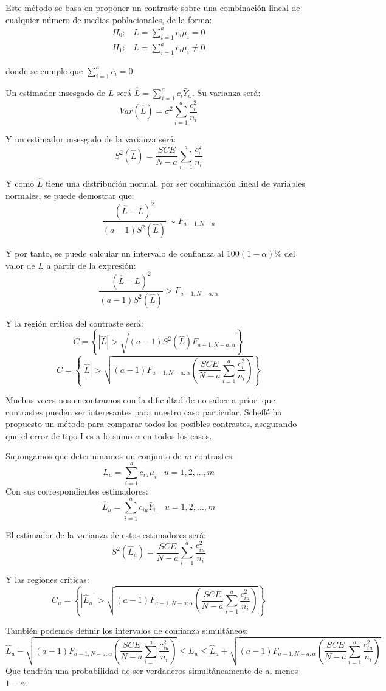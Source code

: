 
Este m\'etodo se basa en proponer un contraste sobre una combinaci\'on lineal de cualquier n\'umero de medias poblacionales, de la forma:
\begin{align}
H_0:&L=\sum_{i=1}^ac_i\mu_i=0\\
H_1:&L=\sum_{i=1}^ac_i\mu_i\neq0
\end{align}

donde se cumple que $\sum_{i=1}^ac_i=0$.

Un estimador insesgado de $L$ ser\'a $\hat{L}=\sum_{i=1}^ac_i\bar{Y}_{i.}$. Su varianza ser\'a:
\[Var(\hat{L})=\sigma^2\sum_{i=1}^a\dfrac{c_i^2}{n_i}\]

Y un estimador insesgado de la varianza ser\'a:
\[S^2(\hat{L})=\dfrac{SCE}{N-a}\sum_{i=1}^a\dfrac{c_i^2}{n_i}\]

Y como $\hat{L}$ tiene una distribuci\'on normal, por ser combinaci\'on lineal de variables normales, se puede demostrar que:
\[\dfrac{(\hat{L}-L)^2}{(a-1)S^2(\hat{L})}\sim F_{a-1;N-a}\]

Y por tanto, se puede calcular un intervalo de confianza al $100(1-\alpha)\%$ del valor de $L$ a partir de la expresi\'on:
\[\dfrac{(\hat{L}-L)^2}{(a-1)S^2(\hat{L})}> F_{a-1,N-a:\alpha}\]

Y la regi\'on cr\'itica del contraste ser\'a: 
\[C=\left\{|\hat{L}|>\sqrt{(a-1)S^2(\hat{L})F_{a-1,N-a:\alpha}}\right\}\]
\[C=\left\{|\hat{L}|>\sqrt{(a-1)F_{a-1,N-a:\alpha}\left(\dfrac{SCE}{N-a}\sum_{i=1}^a\dfrac{c_i^2}{n_i}\right)}\right\}\]

Muchas veces nos encontramos con la dificultad de no saber a priori que contrastes pueden ser interesantes para nuestro caso particular. Scheff\'e ha propuesto un m\'etodo para comparar todos los posibles contrastes, asegurando que el error de tipo I es a lo sumo $\alpha$ en todos los casos.

Supongamos que determinamos un conjunto de $m$ contrastes:
\[L_u=\sum_{i=1}^ac_{iu}\mu_i\;\;\;u=1,2,\ldots,m\]
Con sus correspondientes estimadores:
\[\hat{L}_u=\sum_{i=1}^ac_{iu}\bar{Y}_{i.}\;\;\;u=1,2,\ldots,m\]

El estimador de la varianza de estos estimadores ser\'a:
\[S^2(\hat{L}_u)=\dfrac{SCE}{N-a}\sum_{i=1}^a\dfrac{c_{iu}^2}{n_i}\]

Y las regiones cr\'iticas:
\[C_u=\left\{|\hat{L}_u|>\sqrt{(a-1)F_{a-1,N-a:\alpha}\left(\dfrac{SCE}{N-a}\sum_{i=1}^a\dfrac{c_{iu}^2}{n_i}\right)}\right\}\]

Tambi\'en podemos definir los intervalos de confianza simult\'aneos:
\[\hat{L}_u-\sqrt{(a-1)F_{a-1,N-a:\alpha}\left(\dfrac{SCE}{N-a}\sum_{i=1}^a\dfrac{c_{iu}^2}{n_i}\right)}\leq L_u\leq\hat{L}_u+\sqrt{(a-1)F_{a-1,N-a:\alpha}\left(\dfrac{SCE}{N-a}\sum_{i=1}^a\dfrac{c_{iu}^2}{n_i}\right)}\]
Que tendr\'an una probabilidad de ser verdaderos simult\'aneamente de al menos $1-\alpha$.


